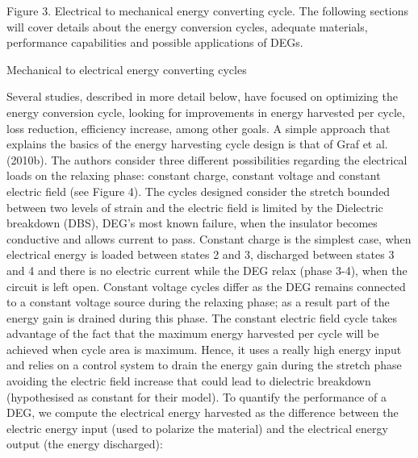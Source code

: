 Figure 3. Electrical to mechanical energy converting cycle.
	The following sections will cover details about the energy conversion cycles, adequate materials, performance capabilities and possible applications of DEGs.

Mechanical to electrical energy converting cycles

	Several studies, described in more detail below, have focused on optimizing the energy conversion cycle, looking for improvements in energy harvested per cycle, loss reduction, efficiency increase, among other goals. 
A simple approach that explains the basics of the energy harvesting cycle design is that of Graf et al. (2010b). The authors consider three different possibilities regarding the electrical loads on the relaxing phase: constant charge, constant voltage and constant electric field (see Figure 4). The cycles designed consider the stretch bounded between two levels of strain and the electric field is limited by the Dielectric breakdown (DBS), DEG’s most known failure, when the insulator becomes conductive and allows current to pass.
Constant charge is the simplest case, when electrical energy is loaded between states 2 and 3, discharged between states 3 and 4 and there is no electric current while the DEG relax (phase 3-4), when the circuit is left open. Constant voltage cycles differ as the DEG remains connected to a constant voltage source during the relaxing phase; as a result part of the energy gain is drained during this phase. The constant electric field cycle takes advantage of the fact that the maximum energy harvested per cycle will be achieved when cycle area is maximum. Hence, it uses a really high energy input and relies on a control system to drain the energy gain during the stretch phase avoiding the electric field increase that could lead to dielectric breakdown (hypothesised as constant for their model). 
To quantify the performance of a DEG, we compute the electrical energy harvested as the difference between the electric energy input (used to polarize the material) and the electrical energy output (the energy discharged):


